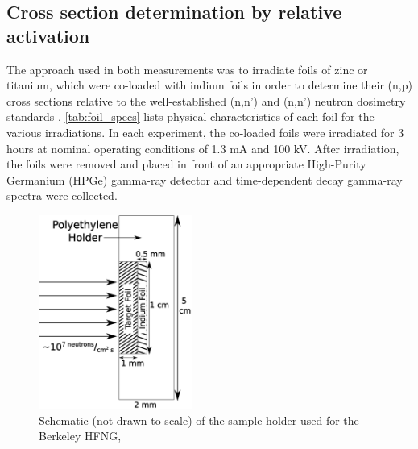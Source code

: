 \documentclass[5p]{elsarticle}
\begin{document}
\subsection{Cross section determination by relative activation}\label{sec:sample_loading}


The approach used in both measurements was to irradiate foils of zinc or titanium, which were co-loaded with indium foils in order to determine their (n,p) cross sections relative to the well-established (n,n') and (n,n') neutron dosimetry standards \cite{Capote2012,zsolnay2012technical}.
  \autoref{tab:foil_specs} lists physical characteristics of each foil for the various irradiations.
In each experiment, the co-loaded foils were irradiated for 3 hours at nominal operating conditions of 1.3 mA and 100 kV.
 After irradiation, the foils were removed and placed in front of an appropriate High-Purity Germanium (HPGe) gamma-ray detector and time-dependent decay gamma-ray spectra were collected.
  



\begin{figure}
    \centering
        \includegraphics[height=2.5in]{./figures/holder.pdf}
        \caption{Schematic (not drawn to scale) of the sample holder used for the Berkeley HFNG,}
        \label{fig:holder_a}
\end{figure}
\end{document}

